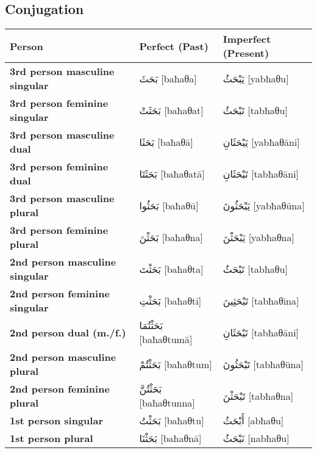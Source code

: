 \documentclass[letterpaper,12pt]{article}
\begin{document}
\subsection{Conjugation}
\begin{longtable}{|>{\raggedright}p{3.5cm}|p{5cm}|p{5cm}|}
\hline
\textbf{Person} & \textbf{Perfect (Past)} & \textbf{Imperfect (Present)} \\
\hline
\textbf{3rd person masculine singular} & \textarabic{بَحَثَ} [baħaθa] & \textarabic{يَبْحَثُ} [yabħaθu] \\
\hline
\textbf{3rd person feminine singular} & \textarabic{بَحَثَتْ} [baħaθat] & \textarabic{تَبْحَثُ} [tabħaθu] \\
\hline
\textbf{3rd person masculine dual} & \textarabic{بَحَثَا} [baħaθā] & \textarabic{يَبْحَثَانِ} [yabħaθāni] \\
\hline
\textbf{3rd person feminine dual} & \textarabic{بَحَثَتَا} [baħaθatā] & \textarabic{تَبْحَثَانِ} [tabħaθāni] \\
\hline
\textbf{3rd person masculine plural} & \textarabic{بَحَثُوا} [baħaθū] & \textarabic{يَبْحَثُونَ} [yabħaθūna] \\
\hline
\textbf{3rd person feminine plural} & \textarabic{بَحَثْنَ} [baħaθna] & \textarabic{يَبْحَثْنَ} [yabħaθna] \\
\hline
\textbf{2nd person masculine singular} & \textarabic{بَحَثْتَ} [baħaθta] & \textarabic{تَبْحَثُ} [tabħaθu] \\
\hline
\textbf{2nd person feminine singular} & \textarabic{بَحَثْتِ} [baħaθti] & \textarabic{تَبْحَثِينَ} [tabħaθīna] \\
\hline
\textbf{2nd person dual (m./f.)} & \textarabic{بَحَثْتُمَا} [baħaθtumā] & \textarabic{تَبْحَثَانِ} [tabħaθāni] \\
\hline
\textbf{2nd person masculine plural} & \textarabic{بَحَثْتُمْ} [baħaθtum] & \textarabic{تَبْحَثُونَ} [tabħaθūna] \\
\hline
\textbf{2nd person feminine plural} & \textarabic{بَحَثْتُنَّ} [baħaθtunna] & \textarabic{تَبْحَثْنَ} [tabħaθna] \\
\hline
\textbf{1st person singular} & \textarabic{بَحَثْتُ} [baħaθtu] & \textarabic{أَبْحَثُ} [abħaθu] \\
\hline
\textbf{1st person plural} & \textarabic{بَحَثْنَا} [baħaθnā] & \textarabic{نَبْحَثُ} [nabħaθu] \\
\hline
\end{longtable}
\end{document}
